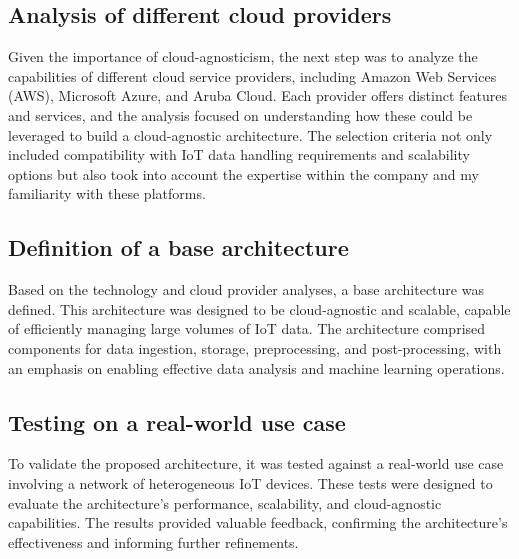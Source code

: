 \subsection{Analysis of different cloud providers}
\label{sec:analysis-of-different-cloud-providers}
Given the importance of cloud-agnosticism, the next step was to analyze the capabilities of different cloud service providers, including Amazon Web Services (AWS)\cite{site:aws}, Microsoft Azure\cite{site:azure}, and Aruba Cloud\cite{site:aruba-cloud}. Each provider offers distinct features and services, and the analysis focused on understanding how these could be leveraged to build a cloud-agnostic architecture. The selection criteria not only included compatibility with IoT data handling requirements and scalability options but also took into account the expertise within the company and my familiarity with these platforms.


\subsection{Definition of a base architecture}
\label{sec:definition-of-a-base-architecture}
Based on the technology and cloud provider analyses, a base architecture was defined. This architecture was designed to be cloud-agnostic and scalable, capable of efficiently managing large volumes of IoT data. The architecture comprised components for data ingestion, storage, preprocessing, and post-processing, with an emphasis on enabling effective data analysis and machine learning operations.

\subsection{Testing on a real-world use case}
\label{sec:testing-on-a-real-world-use-case}
To validate the proposed architecture, it was tested against a real-world use case involving a network of heterogeneous IoT devices. These tests were designed to evaluate the architecture's performance, scalability, and cloud-agnostic capabilities. The results provided valuable feedback, confirming the architecture's effectiveness and informing further refinements.
